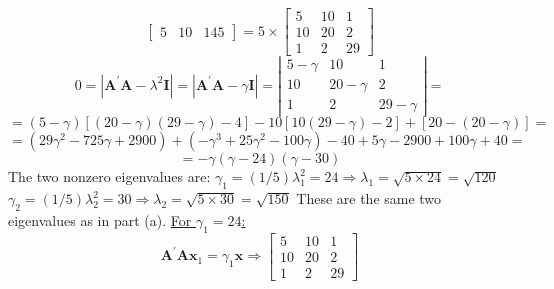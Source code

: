 \begin{enumerate}[label=(\alph*)]
\[\begin{bmatrix}
                    5 & 10 & 145
                \end{bmatrix}
                =
                5 \times
                \begin{bmatrix}
                    5 & 10 & 1 \\
                    10 & 20 & 2 \\
                    1 & 2 & 29
                \end{bmatrix}
            \]
            \[
                0 = \left|\mathbf{A}^\prime\mathbf{A} - \lambda^2\mathbf{I}\right| = \left|\mathbf{A}^\prime\mathbf{A} - \gamma\mathbf{I}\right|
                =
                \left|
                \begin{matrix}
                    5-\gamma & 10 & 1 \\
                    10 & 20-\gamma & 2 \\
                    1 & 2 & 29-\gamma
                \end{matrix}
                \right|
                =
            \]
            \[
                =
                (5-\gamma)[(20-\gamma)(29-\gamma) - 4] - 10[10(29-\gamma) - 2] + [20 - (20-\gamma)]
                =
            \]
            \[
                =
                (29\gamma^2 - 725\gamma + 2900)+(-\gamma^3 + 25\gamma^2 - 100\gamma) - 40 + 5\gamma - 2900 + 100\gamma + 40
                =
            \]
            \[
                =
                -\gamma(\gamma - 24)(\gamma - 30)
            \]
            The two nonzero eigenvalues are:
            \newline
            $\gamma_1=(1/5)\lambda_1^2= 24 \Rightarrow \lambda_1 = \sqrt{5 \times 24} = \sqrt{120}$
            \newline
            $\gamma_2=(1/5)\lambda_2^2= 30 \Rightarrow \lambda_2 = \sqrt{5 \times 30} = \sqrt{150}$
            \newline
            These are the same two eigenvalues as in part (a).
            \newline
            \newline
            \underline{For $\gamma_1 = 24$:}
            \[
                \mathbf{A}^\prime\mathbf{A}\mathbf{x}_1 = \gamma_1\mathbf{x}
                \Rightarrow
                \begin{bmatrix}
                    5 & 10 & 1 \\
                    10 & 20 & 2 \\
                    1 & 2 & 29
                \end{bmatrix}
\]
\end{enumerate}
